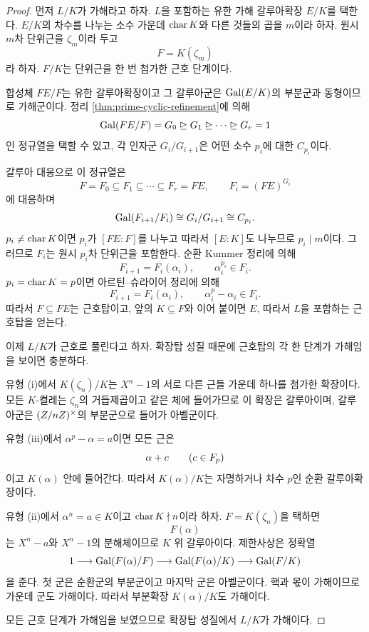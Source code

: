 \begin{proof}
먼저 $L/K$가 가해라고 하자. $L$을 포함하는 유한 가해 갈루아확장 $E/K$를 택한다. $E/K$의 차수를 나누는 소수 가운데 $\operatorname{char} K$와 다른 것들의 곱을 $m$이라 하자. 원시 $m$차 단위근을 $\zeta_m$이라 두고
\[
  F=K(\zeta_m)
\]
라 하자. $F/K$는 단위근을 한 번 첨가한 근호 단계이다.

합성체 $FE/F$는 유한 갈루아확장이고 그 갈루아군은 $\operatorname{Gal}(E/K)$의 부분군과 동형이므로 가해군이다. 정리 \ref{thm:prime-cyclic-refinement}에 의해
\[
  \operatorname{Gal}(FE/F)=G_0\trianglerighteq G_1
  \trianglerighteq\cdots\trianglerighteq G_r=1
\]
인 정규열을 택할 수 있고, 각 인자군 $G_i/G_{i+1}$은 어떤 소수 $p_i$에 대한 $C_{p_i}$이다.

갈루아 대응으로 이 정규열은
\[
  F=F_0\subseteq F_1\subseteq\cdots\subseteq F_r=FE,
  \qquad
  F_i=(FE)^{G_i}
\]
에 대응하며
\[
  \operatorname{Gal}(F_{i+1}/F_i)\cong G_i/G_{i+1}\cong C_{p_i}.
\]
$p_i\ne\operatorname{char} K$이면 $p_i$가 $[FE:F]$를 나누고 따라서 $[E:K]$도 나누므로 $p_i\mid m$이다. 그러므로 $F_i$는 원시 $p_i$차 단위근을 포함한다. 순환 Kummer 정리에 의해
\[
  F_{i+1}=F_i(\alpha_i),
  \qquad
  \alpha_i^{p_i}\in F_i.
\]
$p_i=\operatorname{char} K=p$이면 아르틴--슈라이어 정리에 의해
\[
  F_{i+1}=F_i(\alpha_i),
  \qquad
  \alpha_i^p-\alpha_i\in F_i.
\]
따라서 $F\subseteq FE$는 근호탑이고, 앞의 $K\subseteq F$와 이어 붙이면 $E$, 따라서 $L$을 포함하는 근호탑을 얻는다.

이제 $L/K$가 근호로 풀린다고 하자. 확장탑 성질 때문에 근호탑의 각 한 단계가 가해임을 보이면 충분하다.

유형 (i)에서 $K(\zeta_n)/K$는 $X^n-1$의 서로 다른 근들 가운데 하나를 첨가한 확장이다. 모든 $K$-켤레는 $\zeta_n$의 거듭제곱이고 같은 체에 들어가므로 이 확장은 갈루아이며, 갈루아군은 $(Z/nZ)^\times$의 부분군으로 들어가 아벨군이다.

유형 (iii)에서 $\alpha^p-\alpha=a$이면 모든 근은
\[
  \alpha+c\qquad(c\in F_p)
\]
이고 $K(\alpha)$ 안에 들어간다. 따라서 $K(\alpha)/K$는 자명하거나 차수 $p$인 순환 갈루아확장이다.

유형 (ii)에서 $\alpha^n=a\in K$이고 $\operatorname{char} K\nmid n$이라 하자. $F=K(\zeta_n)$을 택하면
\[
  F(\alpha)
\]
는 $X^n-a$와 $X^n-1$의 분해체이므로 $K$ 위 갈루아이다. 제한사상은 정확열
\[
  1\longrightarrow\operatorname{Gal}(F(\alpha)/F)
  \longrightarrow\operatorname{Gal}(F(\alpha)/K)
  \longrightarrow\operatorname{Gal}(F/K)
\]
을 준다. 첫 군은 순환군의 부분군이고 마지막 군은 아벨군이다. 핵과 몫이 가해이므로 가운데 군도 가해이다. 따라서 부분확장 $K(\alpha)/K$도 가해이다.

모든 근호 단계가 가해임을 보였으므로 확장탑 성질에서 $L/K$가 가해이다.
\end{proof}


